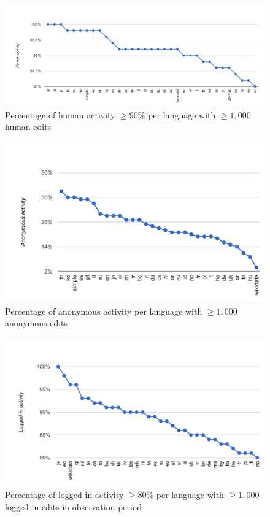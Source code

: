 \documentclass{sig-alternate}
\begin{document}
\begin{figure}[p]
  \center
  \includegraphics[width=\linewidth]{most-human-edited-languages.pdf}
  \caption{Percentage of human activity $\geq90\%$ per language with $\geq1,000$ human edits}
  \label{fig:most-human-edited-languages}
\end{figure}

\begin{figure}[p]
  \center
  \includegraphics[width=\linewidth]{most-anonymous-edited-languages.pdf}
  \caption{Percentage of anonymous activity per language with $\geq1,000$ anonymous edits}
  \label{fig:most-anonymous-edited-languages}
\end{figure}

\begin{figure}[p]
  \center
  \includegraphics[width=\linewidth]{most-logged-in-edited-languages.pdf}
  \caption{Percentage of logged-in activity $\geq80\%$ per language with $\geq1,000$ logged-in edits in observation period}
  \label{fig:most-logged-in-edited-languages}
\end{figure}
\end{document}
